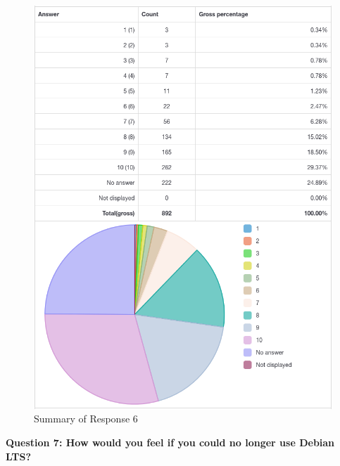 \documentclass{article}
\begin{document}
\vspace{3mm}
\begin{figure}[h!]
\centering
\includegraphics[width=15.5cm]{assets/6-complete-responses.png}
\caption{Summary of Response 6}
\end{figure}

\newpage

\Large{\textbf{Question 7: How would you feel if you could no longer use Debian LTS?}}
\end{document}

